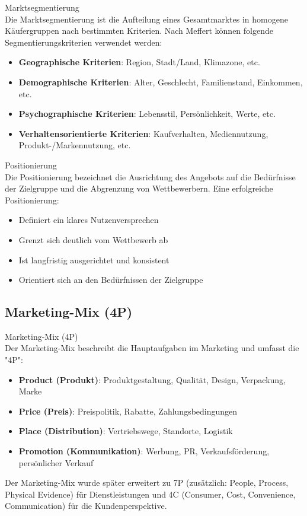 \begin{definition}{Marktsegmentierung}\\
Die Marktsegmentierung ist die Aufteilung eines Gesamtmarktes in homogene Käufergruppen nach bestimmten Kriterien. Nach Meffert können folgende Segmentierungskriterien verwendet werden:
\begin{itemize}
    \item \textbf{Geographische Kriterien}: Region, Stadt/Land, Klimazone, etc.
    \item \textbf{Demographische Kriterien}: Alter, Geschlecht, Familienstand, Einkommen, etc.
    \item \textbf{Psychographische Kriterien}: Lebensstil, Persönlichkeit, Werte, etc.
    \item \textbf{Verhaltensorientierte Kriterien}: Kaufverhalten, Mediennutzung, Produkt-/Markennutzung, etc.
\end{itemize}
\end{definition}

\begin{definition}{Positionierung}\\
Die Positionierung bezeichnet die Ausrichtung des Angebots auf die Bedürfnisse der Zielgruppe und die Abgrenzung von Wettbewerbern. Eine erfolgreiche Positionierung:
\begin{itemize}
    \item Definiert ein klares Nutzenversprechen
    \item Grenzt sich deutlich vom Wettbewerb ab
    \item Ist langfristig ausgerichtet und konsistent
    \item Orientiert sich an den Bedürfnissen der Zielgruppe
\end{itemize}
\end{definition}

\subsection{Marketing-Mix (4P)}

\begin{definition}{Marketing-Mix (4P)}\\
Der Marketing-Mix beschreibt die Hauptaufgaben im Marketing und umfasst die "4P":
\begin{itemize}
    \item \textbf{Product (Produkt)}: Produktgestaltung, Qualität, Design, Verpackung, Marke
    \item \textbf{Price (Preis)}: Preispolitik, Rabatte, Zahlungsbedingungen
    \item \textbf{Place (Distribution)}: Vertriebswege, Standorte, Logistik
    \item \textbf{Promotion (Kommunikation)}: Werbung, PR, Verkaufsförderung, persönlicher Verkauf
\end{itemize}

Der Marketing-Mix wurde später erweitert zu 7P (zusätzlich: People, Process, Physical Evidence) für Dienstleistungen und 4C (Consumer, Cost, Convenience, Communication) für die Kundenperspektive.
\end{definition}

